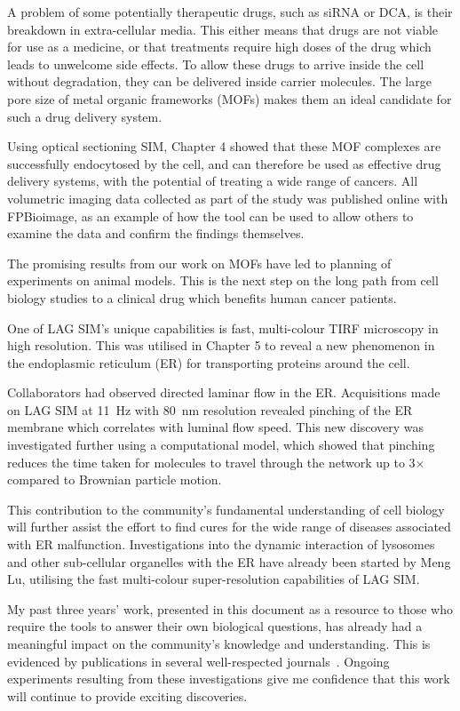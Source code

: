 A problem of some potentially therapeutic drugs, such as siRNA or DCA, is their breakdown in extra-cellular media. 
This either means that drugs are not viable for use as a medicine, or that treatments require high doses of the drug which leads to unwelcome side effects. 
To allow these drugs to arrive inside the cell without degradation, they can be delivered inside carrier molecules. 
The large pore size of metal organic frameworks (MOFs) makes them an ideal candidate for such a drug delivery system. 

Using optical sectioning SIM, Chapter 4 showed that these MOF complexes are successfully endocytosed by the cell, and can therefore be used as effective drug delivery systems, with the potential of treating a wide range of cancers. 
All volumetric imaging data collected as part of the study was published online with FPBioimage, as an example of how the tool can be used to allow others to examine the data and confirm the findings themselves. 

The promising results from our work on MOFs have led to planning of experiments on animal models. 
This is the next step on the long path from cell biology studies to a clinical drug which benefits human cancer patients. 

One of LAG SIM's unique capabilities is fast, multi-colour TIRF microscopy in high resolution. 
This was utilised in Chapter 5 to reveal a new phenomenon in the endoplasmic reticulum (ER) for transporting proteins around the cell. 

Collaborators had observed directed laminar flow in the ER.
Acquisitions made on LAG SIM at \SI{11}{\hertz} with \SI{80}{\nano\metre} resolution revealed pinching of the ER membrane which correlates with luminal flow speed. 
This new discovery was investigated further using a computational model, which showed that pinching reduces the time taken for molecules to travel through the network up to 3$\times$ compared to Brownian particle motion. 

This contribution to the community's fundamental understanding of cell biology will further assist the effort to find cures for the wide range of diseases associated with ER malfunction.
Investigations into the dynamic interaction of lysosomes and other sub-cellular organelles with the ER have already been started by Meng Lu, utilising the fast multi-colour super-resolution capabilities of LAG SIM. 

My past three years' work, presented in this document as a resource to those who require the tools to answer their own biological questions, has already had a meaningful impact on the community's knowledge and understanding.
This is evidenced by publications in several well-respected journals~\cite{teplensky2017temperature, fantham2017new, moghadam2018computer, holcman2018single, lautenschlager2018c}. 
Ongoing experiments resulting from these investigations give me confidence that this work will continue to provide exciting discoveries. 